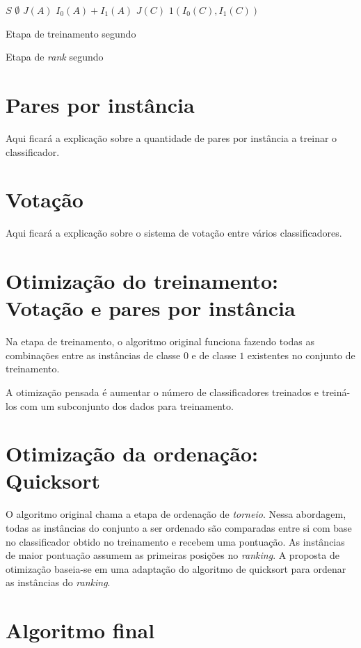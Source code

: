 \begin{algorithm}
\begin{algorithmic}
    
\STATE $S$ \gets $\emptyset$
            \STATE $J(A)$ \gets $I_0(A) + I_1(A)$
            \STATE $J(C)$ \gets $1(I_0(C), I_1(C))$
        \ENDIF
    \ENDFOR
\ENDFOR

\caption{Etapa de treinamento segundo \cite{langford}}
\label{alg_original_train}

\end{algorithmic}    
\end{algorithm}

\begin{algorithm}
\begin{algorithmic}
    


\caption{Etapa de \emph{rank} segundo \cite{langford}}
\label{alg_original_train}

\end{algorithmic}    
\end{algorithm}

\section{Pares por instância}
Aqui ficará a explicação sobre a quantidade de pares por instância a treinar o classificador.

\section{Votação}
Aqui ficará a explicação sobre o sistema de votação entre vários classificadores.
\section{Otimização do treinamento: Votação e pares por instância}
Na etapa de treinamento, o algoritmo original funciona fazendo todas as combinações entre as instâncias de classe $0$ e de classe $1$ existentes no conjunto de treinamento.

A otimização pensada é aumentar o número de classificadores treinados e treiná-los com um subconjunto dos dados para treinamento.

\section{Otimização da ordenação: Quicksort}
O algoritmo original chama a etapa de ordenação de \emph{torneio}. Nessa abordagem, todas as instâncias do conjunto a ser ordenado são comparadas entre si com base no classificador obtido no treinamento e recebem uma pontuação. As instâncias de maior pontuação assumem as primeiras posições no \emph{ranking}. A proposta de otimização baseia-se em uma adaptação do algoritmo de quicksort para ordenar as instâncias do \emph{ranking}.

\section{Algoritmo final}

